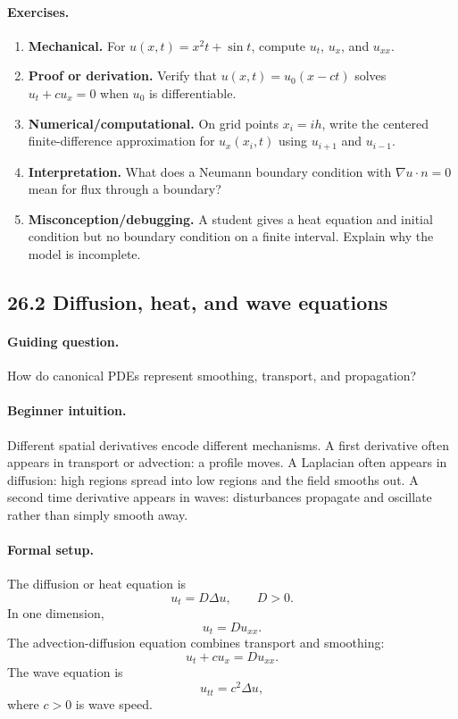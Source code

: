 \paragraph{Exercises.}
\begin{enumerate}[label=\textbf{26.1.\arabic*.}, leftmargin=*]
\item \textbf{Mechanical.} For \(u(x,t)=x^2t+\sin t\), compute \(u_t\), \(u_x\), and \(u_{xx}\).
\item \textbf{Proof or derivation.} Verify that \(u(x,t)=u_0(x-ct)\) solves \(u_t+c u_x=0\) when \(u_0\) is differentiable.
\item \textbf{Numerical/computational.} On grid points \(x_i=ih\), write the centered finite-difference approximation for \(u_x(x_i,t)\) using \(u_{i+1}\) and \(u_{i-1}\).
\item \textbf{Interpretation.} What does a Neumann boundary condition with \(\nabla u\cdot n=0\) mean for flux through a boundary?
\item \textbf{Misconception/debugging.} A student gives a heat equation and initial condition but no boundary condition on a finite interval. Explain why the model is incomplete.
\end{enumerate}

\subsection{26.2 Diffusion, heat, and wave equations}

\paragraph{Guiding question.}
How do canonical PDEs represent smoothing, transport, and propagation?

\paragraph{Beginner intuition.}
Different spatial derivatives encode different mechanisms. A first derivative often appears in transport or advection: a profile moves. A Laplacian often appears in diffusion: high regions spread into low regions and the field smooths out. A second time derivative appears in waves: disturbances propagate and oscillate rather than simply smooth away.

\paragraph{Formal setup.}
The diffusion or heat equation is
\[
u_t=D\Delta u,\qquad D>0.
\]
In one dimension,
\[
u_t=D u_{xx}.
\]
The advection-diffusion equation combines transport and smoothing:
\[
u_t+c u_x=D u_{xx}.
\]
The wave equation is
\[
u_{tt}=c^2\Delta u,
\]
where \(c>0\) is wave speed.

